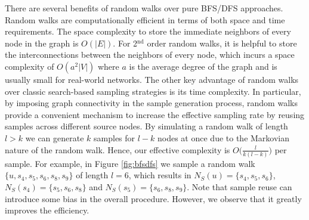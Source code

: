 

 There are several benefits of random walks over pure BFS/DFS approaches. Random walks are computationally efficient in terms of both space and time requirements. The space complexity to store the immediate neighbors of every node in the graph is $O(|E|)$. 
For 2$^{\textrm{nd}}$ order random walks, it is helpful to store the interconnections between the neighbors of every node, which incurs a space complexity of $O(a^2|V|)$ where $a$ is the average degree of the graph and is usually small for real-world networks. 
The other key advantage of random walks over classic search-based sampling strategies is its time complexity. 
%
In particular, by imposing graph connectivity in the sample generation process, random walks provide a convenient mechanism to increase the effective sampling rate by reusing samples across different source nodes. By simulating a random walk of length $l>k$ we can generate $k$ samples for $l-k$ nodes at once due to the Markovian nature of the random walk. Hence, our effective complexity is $O\big(\frac{l}{k(l-k)}\big)$ per sample. For example, in Figure \ref{fig:bfsdfs} we sample a random walk $\{u, s_4, s_5, s_6, s_8, s_9\}$ of length $l=6$, which results in $N_S(u) =\{s_4, s_5, s_6\}$, $N_S(s_4)=\{s_5, s_6, s_8\}$ and $N_S(s_5)=\{s_6, s_8, s_9\}$.
Note that sample reuse can introduce some bias in the overall procedure. However, we observe that it greatly improves the efficiency.

